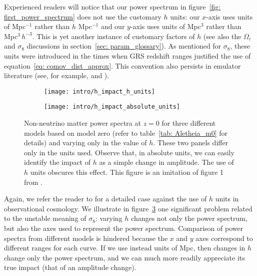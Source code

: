 
Experienced readers will notice that our power spectrum in
figure~\ref{fig: first_power_spectrum} does not use the customary $h$ units:
our $x$-axis uses units of Mpc$^{-1}$ rather than $h$ Mpc$^{-1}$ and our
$y$-axis uses units of Mpc$^3$ rather than Mpc$^3 \, h^{-3}$. This is yet
another instance of customary factors of $h$ (see also the $\Omega_i$ and
$\sigma_8$ discussions in section~\ref{sec: param_glossary}). As mentioned
for $\sigma_8$, these units were introduced in the times when GRS redshift 
ranges justified the use of equation~\ref{eq: comov_dist_approx}. This
convention also persists in emulator literature (see, for example,
 and ).

\begin{figure}[htb]
    \begin{subfigure}{0.45 \textwidth}
    \centering
 		\texttt{[image: intro/h\_impact\_h\_units]}
 		\label{fig: h_units}
    \end{subfigure}
    \begin{subfigure}{0.45 \textwidth}
    \centering
 		\texttt{[image: intro/h\_impact\_absolute\_units]}
 		\label{fig: without_h_units}
    \end{subfigure}
        \centering
    \caption[Impact of $h$ on $P(k)$]
    		{Non-neutrino matter power spectra at $z=0$ for three different
    		models based on model zero (refer to table~\ref{tab: Aletheia_m0} 
    		for details) and varying only in the value of $h$. These two
    		panels
    		differ only in the units used. Observe that, in absolute units, we
    		can easily identify the impact of $h$ as a simple change in
    		amplitude. The use of $h$ units obscures this effect. This figure 
    		is an imitation of figure 1 from .}
    \label{fig: h_unit_Pk}
\end{figure}


Again, we refer the reader to  for a detailed case against the
use of $h$ units in observational cosmology. We illustrate in
figure~\ref{fig: h_unit_Pk} one significant problem related to the
unstable meaning of $\sigma_8$: varying $h$ changes not only the power 
spectrum, but also the axes used to represent the power spectrum. Comparison 
of power spectra from different 
models is hindered because the $x$ and $y$ axes correspond to different ranges
for each curve. If we use instead units of Mpc, then changes in $h$ change
only the power spectrum, and we can much more readily appreciate its true
impact (that of an amplitude change).

